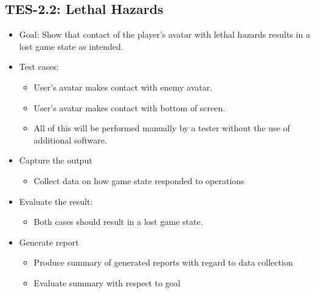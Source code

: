 \subsection{TES-2.2: Lethal Hazards }
\label{hazard}
\begin{itemize}
\item Goal: Show that contact of the player\textquoteright{}s avatar with
lethal hazards results in a lost game state as intended. 
\item Test cases: 

\begin{itemize}
\item User\textquoteright{}s avatar makes contact with enemy avatar. 
\item User\textquoteright{}s avatar makes contact with bottom of screen. 
\item All of this will be performed manually by a tester without the use of additional software.
\end{itemize}
\item Capture the output 

\begin{itemize}
\item Collect data on how game state responded to operations 
\end{itemize}
\item Evaluate the result: 

\begin{itemize}
\item Both cases should result in a lost game state. 
\end{itemize}
\item Generate report 

\begin{itemize}
\item Produce summary of generated reports with regard to data collection 
\item Evaluate summary with respect to goal
\end{itemize}
\end{itemize}

